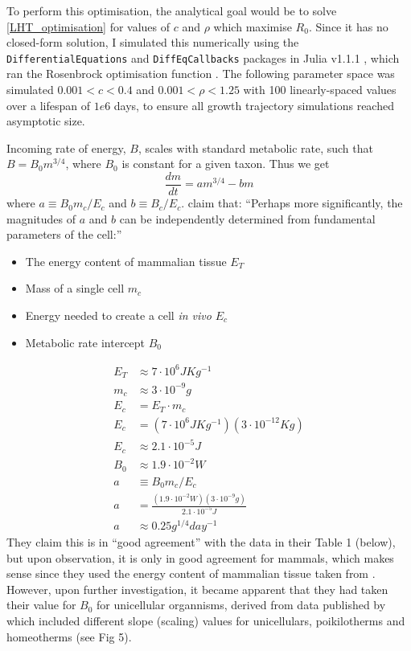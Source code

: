 \documentclass[a4paper]{article} %
\begin{document}
To perform this optimisation, the analytical goal would be to solve \cref{LHT_optimisation} for values of $c$ and $\rho$ which maximise $R_0$. Since it has no closed-form solution, I simulated this numerically using the \texttt{DifferentialEquations} and \texttt{DiffEqCallbacks} packages in Julia v1.1.1 \autocite{Bezanson2017}, which ran the Rosenbrock optimisation function \autocite{Rosenbrock1960}. The following parameter space was simulated $0.001 < c < 0.4$ and $0.001 < \rho < 1.25$ with 100 linearly-spaced values over a lifespan of $1e6$ days, to ensure all growth trajectory simulations reached asymptotic size.


Incoming rate of energy, $B$, scales with standard metabolic rate, such that $B = B_{0}m^{3/4}$, where $B_0$ is constant for a given taxon. Thus we get
\begin{equation}
    \frac{dm}{dt} = am^{3/4} - bm
\end{equation}
where $a \equiv B_{0}m_{c}/E_{c}$ and $b \equiv B_{c}/E_{c}$. \cite{West2001} claim that: ``Perhaps more significantly, the magnitudes of $a$ and $b$ can be independently determined from fundamental parameters of the cell:'' 
\begin{itemize}
    \item The energy content of mammalian tissue $E_T$
    \item Mass of a single cell $m_c$
    \item Energy needed to create a cell \textit{in vivo} $E_c$
    \item Metabolic rate intercept $B_0$
\end{itemize} 
\begin{align*}
    E_T &\approx 7 \cdot 10^6 JKg^{-1} \\
    m_c &\approx 3 \cdot 10^{-9} g \\
    E_c &= E_T \cdot m_c \\
    E_c &= (7 \cdot 10^6 JKg^{-1})(3 \cdot 10^{-12} Kg) \\
    E_c &\approx 2.1 \cdot 10^{-5} J \\
    B_0 &\approx 1.9 \cdot 10^{-2} W \\
    a &\equiv B_{0}m_{c}/E_{c} \\
    a &= \frac{(1.9 \cdot 10^{-2} W)(3 \cdot 10^{-9} g)}{2.1 \cdot 10^{-5} J}\\
    a &\approx 0.25 g^{1/4}day^{-1}
\end{align*}
\newpage
They claim this is in ``good agreement'' with the data in their Table 1 (below), but upon observation, it is only in good agreement for mammals, which makes sense since they used the energy content of mammalian tissue taken from \cite{peters1983}. However, upon further investigation, it became apparent that they had taken their value for $B_0$ for unicellular organnisms, derived from data published by \cite{Hemmingsen1960} which included different slope (scaling) values for unicellulars, poikilotherms and homeotherms (see Fig 5).
\end{document}
